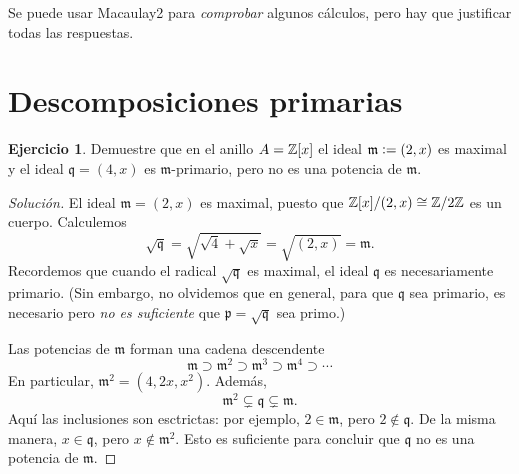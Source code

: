 \documentclass{article}
\theoremstyle{definition}
\newtheorem{ejerc}{Ejercicio}
\newenvironment{solucion}{\begin{proof}[Solución]}{\end{proof}}
\begin{document}

Se puede usar Macaulay2 para \emph{comprobar} algunos cálculos, pero hay que
justificar todas las respuestas.

\section*{Descomposiciones primarias}

\begin{ejerc}
  Demuestre que en el anillo $A = \mathbb{Z} [x]$ el ideal $\mathfrak{m} \mathrel{\mathop:}= (2,x)$ es
  maximal y el ideal $\mathfrak{q} = (4,x)$ es $\mathfrak{m}$-primario, pero no
  es una potencia de $\mathfrak{m}$.

  \ifdefined\solutions\begin{solucion}
    El ideal $\mathfrak{m} = (2,x)$ es maximal, puesto que
    $\mathbb{Z} [x]/(2,x) \cong \mathbb{Z}/2\mathbb{Z}$ es un cuerpo. Calculemos
    \[ \sqrt{\mathfrak{q}} =
       \sqrt{\sqrt{4} + \sqrt{x}} =
       \sqrt{(2,x)} =
       \mathfrak{m}. \]
    Recordemos que cuando el radical $\sqrt{\mathfrak{q}}$ es maximal, el ideal
    $\mathfrak{q}$ es necesariamente primario. (Sin embargo, no olvidemos que en
    general, para que $\mathfrak{q}$ sea primario, es necesario pero
    \emph{no es suficiente} que $\mathfrak{p} = \sqrt{\mathfrak{q}}$ sea primo.)

    Las potencias de $\mathfrak{m}$ forman una cadena descendente
    \[ \mathfrak{m} \supset \mathfrak{m}^2 \supset \mathfrak{m}^3 \supset
       \mathfrak{m}^4 \supset \cdots \]
    En particular, $\mathfrak{m}^2 = (4, 2x, x^2)$. Además,
    $$\mathfrak{m}^2 \subsetneq \mathfrak{q} \subsetneq \mathfrak{m}.$$
    Aquí las inclusiones son esctrictas: por ejemplo, $2 \in \mathfrak{m}$, pero
    $2 \notin \mathfrak{q}$. De la misma manera, $x \in \mathfrak{q}$, pero
    $x \notin \mathfrak{m}^2$. Esto es suficiente para concluir que
    $\mathfrak{q}$ no es una potencia de $\mathfrak{m}$.
  \end{solucion}\fi
\end{ejerc}
\end{document}

